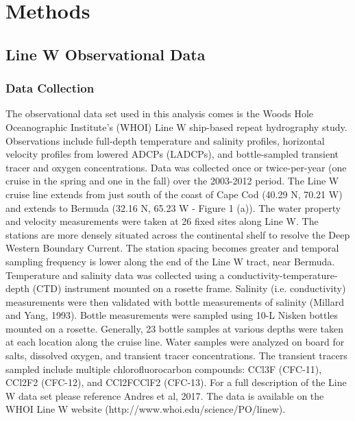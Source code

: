 \section{Methods}
\label{section:methods}

\subsection{Line W Observational Data}
\subsubsection{Data Collection}
The observational data set used in this analysis comes is the Woods Hole Oceanographic Institute's (WHOI) Line W ship-based repeat hydrography study. Observations include full-depth temperature and salinity profiles, horizontal velocity profiles from lowered ADCPs (LADCPs), and bottle-sampled transient tracer and oxygen concentrations.  Data was collected once or twice-per-year (one cruise in the spring and one in the fall) over the 2003-2012 period. The Line W cruise line extends from just south of the coast of Cape Cod (40.29 N, 70.21 W) and extends to Bermuda (32.16 N, 65.23 W - Figure 1 (a)). The water property and velocity measurements were taken at 26 fixed sites along Line W. The stations are more densely situated across the continental shelf to resolve the Deep Western Boundary Current. The station spacing becomes greater and temporal sampling frequency is lower along the end of the Line W tract, near Bermuda.
	Temperature and salinity data was collected using a conductivity-temperature-depth (CTD) instrument mounted on a rosette frame. Salinity (i.e. conductivity) measurements were then validated with bottle measurements of salinity (Millard and Yang, 1993). Bottle measurements were sampled using 10-L Nisken bottles mounted on a rosette. Generally, 23 bottle samples at various depths were taken at each location along the cruise line. Water samples were analyzed on board for salts, dissolved oxygen, and transient tracer concentrations. The transient tracers sampled include multiple chlorofluorocarbon compounds: CCl3F (CFC-11), CCl2F2 (CFC-12), and CCl2FCClF2 (CFC-13).
For a full description of the Line W data set please reference Andres et al, 2017. The data is available on the WHOI Line W website (http://www.whoi.edu/science/PO/linew).


